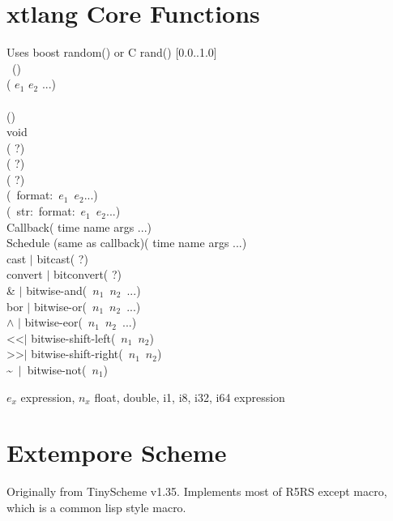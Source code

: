 \documentclass[10pt, twoside]{article}   	%
\begin{document}
\begin{multicols}{3}
\section*{xtlang Core Functions}
Uses boost random() or C rand() [0.0..1.0]  \\
\hphantom{.}\hfill{}~() \\
\hphantom{.}\hfill( $e_1$ $e_2$ ...) \\
\hphantom{.}\hfill{} \\
\hphantom{.}\hfill() \\
void \\
\hphantom{.}\hfill( ?) \\
\hphantom{.}\hfill( ?) \\
\hphantom{.}\hfill( ?) \\
\hphantom{.}\hfill(~format:~$e_1$~$e_2$...) \\
\hphantom{.}\hfill(~str:~format:~$e_1$~$e_2$...)\\
Callback\hfill( time name args ...) \\
Schedule {\scriptsize(same as callback)}\hfill( time name args ...)  \\
cast $\vert$ bitcast\hfill( ?)\\
convert $\vert$ bitconvert\hfill( ?) \\
\& $\vert$ bitwise-and\hfill(~$n_1$~$n_2$~...) \\
bor $\vert$ bitwise-or\hfill(~$n_1$~$n_2$~...) \\
$\wedge$ $\vert$ bitwise-eor\hfill(~$n_1$~$n_2$~...)\\
\textless\textless $\vert$ bitwise-shift-left\hfill(~$n_1$~$n_2$) \\
\textgreater\textgreater $\vert$ bitwise-shift-right\hfill(~$n_1$~$n_2$)\\
\textasciitilde~$\vert$~bitwise-not\hfill(~$n_1$) \\
\scriptsize
{\raggedright
$e_x$ expression,
$n_x$ float, double, i1, i8, i32, i64 expression\par}
\normalsize

\section*{Extempore Scheme}
{\raggedright
Originally from TinyScheme v1.35. Implements most of R5RS except macro, which is a common lisp style macro.\par}



\end{multicols}
\end{document}
